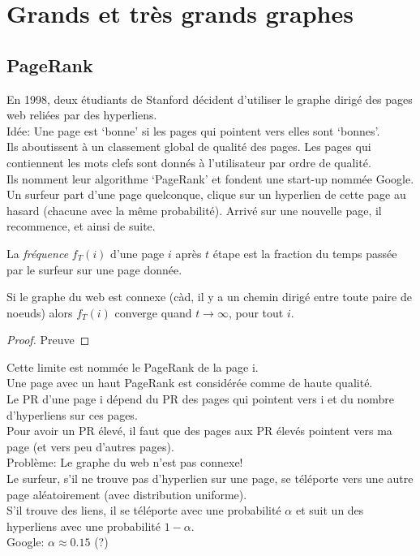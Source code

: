 \section{Grands et très grands graphes}
\subsection{PageRank}
En 1998, deux étudiants de Stanford décident d’utiliser le graphe dirigé des pages web reliées par des hyperliens.\\
Idée: Une page est ‘bonne’ si les pages qui pointent vers elles sont ‘bonnes’.\\
Ils aboutissent à un classement global de qualité des pages. Les pages qui contiennent les mots clefs sont donnés à l’utilisateur par ordre de qualité.\\
Ils nomment leur algorithme ‘PageRank’ et fondent une start-up nommée Google. \\
Un surfeur part d’une page quelconque, clique sur un hyperlien de cette page au hasard (chacune avec la même probabilité). Arrivé sur une nouvelle page, il recommence, et ainsi de suite.\\
\begin{mydef}
  La \emph{fréquence} $f_T(i)$ d’une page $i$ après $t$ étape est la fraction du temps passée par le surfeur sur une page donnée.
\end{mydef}

\begin{mytheo}
  Si le graphe du web est connexe (càd, il y a un chemin dirigé entre toute paire de noeuds) alors $f_T(i)$ converge quand $t \to ∞$, pour tout $i$.
  \begin{proof}
     Preuve \addTODO
  \end{proof}
\end{mytheo}

Cette limite est nommée le PageRank de la page i.\\
Une page avec un haut PageRank est considérée comme de haute qualité.\\
Le PR d’une page i dépend du PR des pages qui pointent vers i et du nombre d’hyperliens sur ces pages.\\
Pour avoir un PR élevé, il faut que des pages aux PR élevés pointent vers ma page (et vers peu d’autres pages).\\
\newline
Problème: Le graphe du web n’est pas connexe!\\
Le surfeur, s’il ne trouve pas d’hyperlien sur une page, se téléporte vers une autre page aléatoirement (avec distribution uniforme).\\
S’il trouve des liens, il se téléporte avec une probabilité $\alpha$ et suit un des hyperliens avec une probabilité $1 − \alpha$.\\
Google: $\alpha ≈ 0.15$ (?)